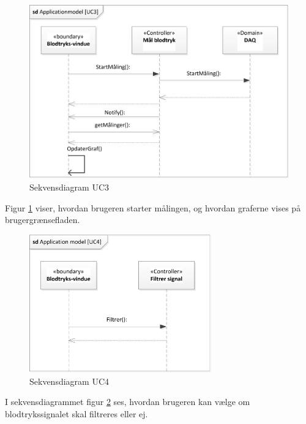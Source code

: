 \begin{figure}[H]
	\includegraphics[width=1\textwidth]{Figurer/ISE/sdAppModelUC3}
	\caption{Sekvensdiagram UC3}
	\label{sd UC3}
\end{figure}

Figur \ref{sd UC3} viser, hvordan brugeren starter målingen, og hvordan graferne vises på brugergrænsefladen.

\begin{figure}[H]
	\includegraphics[width=0.7\textwidth]{Figurer/ISE/sdAppModelUC4}
	\caption{Sekvensdiagram UC4}
	\label{sd UC4}
\end{figure}

I sekvensdiagrammet figur \ref{sd UC4} ses, hvordan brugeren kan vælge om blodtrykssignalet skal filtreres eller ej.

